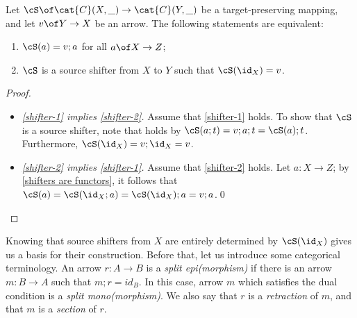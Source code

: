 %
\begin{lemma}
Let $\cS \of \cat{C}(X,\_) \to \cat{C}(Y, \_)$  be a target-preserving mapping, and let $v\of Y\to X$ be an arrow. The following statements are equivalent:
\begin{enumerate}[topsep=\smallskipamount,label=(\alph*),ref=(\alph{enumi})]
\item\label{shifter-1} $\cS(a)=v;a$ for all $a\of X\to Z$;
\item\label{shifter-2} $\cS$ is a source shifter from $X$ to $Y$ such that $\cS(\id_X)=v$.
\end{enumerate}
\end{lemma}
%
\begin{fullorname}
\begin{proof}
\begin{itemize}[topsep=\smallskipamount]
\item \emph{\ref{shifter-1} implies \ref{shifter-2}.}
%
Assume that \ref{shifter-1} holds. To show that  $\cS$ is a source shifter, note that   holds by $\cS(a;t)=v;a;t=\cS(a);t$. Furthermore, $\cS(\id_X)=v;\id_X=v$.

\item \emph{\ref{shifter-2} implies \ref{shifter-1}.}
%
Assume that \ref{shifter-2} holds. Let $a:X\to Z$; by \eqref{shifters are functors}, it follows that $\cS(a)=\cS(\id_X;a)=\cS(\id_X);a=v;a$.\qed
\end{itemize}
\end{proof}
\end{fullorname}
%
Knowing that source shifters from $X$ are entirely determined by $\cS(\id_X)$ gives us a basis for their construction. Before that, let us introduce some categorical terminology. An arrow $r: A \to B$ is a \emph{split epi(morphism)} if there is an arrow $m:B\to A$ such that $m;r = id_B$. In this case, arrow $m$ which satisfies the dual condition is a 
\emph{split mono(morphism)}. We also say that $r$ is a \emph{retraction} of $m$, and that $m$ is a \emph{section} of $r$.

